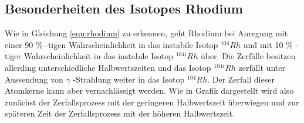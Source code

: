 \subsection{Besonderheiten des Isotopes Rhodium}
    Wie in Gleichung \ref{eqn:rhodium} zu erkennen, geht Rhodium bei Anregung mit einer 90 \% -tigen
    Wahrscheinlichkeit in das instabile Isotop $^{104}Rh$ und mit 10 \% -tiger Wahrscheinlichkeit 
    in das instabile Isotop $^{104i}Rh$ über. Die Zerfälle besitzen allerding unterschiedliche 
    Halbwertszeiten und das Isotop $^{104i}Rh$ zerfällt unter Aussendung von $\gamma$ -Strahlung 
    weiter in das Isotop $^{104}Rh$. Der Zerfall dieser Atomkerne kann aber vernachlässigt werden.
    Wie in Grafik dargestellt wird also zunächst der Zerfallsprozess mit der geringeren Halbwertszeit
    überwiegen und zur späteren Zeit der Zerfallsprozess mit der höheren Halbwertszeit.
    
